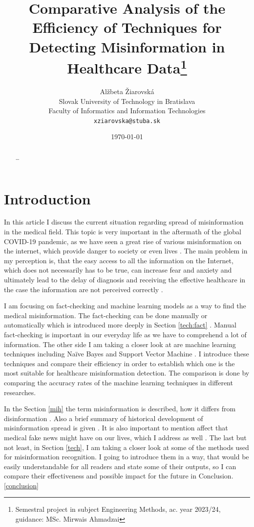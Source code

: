 \documentclass[11pt ,english,a4paper]{article}
\title{Comparative Analysis of the Efficiency of Techniques for Detecting Misinformation in Healthcare Data\thanks{Semestral project in subject Engineering Methods, ac. year 2023/24, guidance: MSc. Mirwais Ahmadzai}}
\author{Alžbeta Žiarovská\\[2pt]
	{\small Slovak University of Technology in Bratislava}\\
	{\small Faculty of Informatics and Information Technologies}\\
	{\small \texttt{xziarovska@stuba.sk}}
	}
\date{\small \today}
\begin{document}
\maketitle
\newpage

\begin{abstract}
\ldots
\end{abstract}
\newpage

\section{Introduction}\label{intro}

In this article I discuss the current situation regarding spread of misinformation in the medical field. This topic is very important in the aftermath of the global COVID-19 pandemic, as we have seen a great rise of various misinformation on the internet, which provide danger to society or even lives \cite{war18dr}. The main problem in my perception is, that the easy access to all the information on the Internet, which does not necessarily has to be true, can increase fear and anxiety and ultimately lead to the delay of diagnosis and receiving the effective healthcare in the case the information are not perceived correctly \cite{wa19sys}. 

I am focusing on fact-checking and machine learning models as a way to find the medical misinformation. The fact-checking can be done manually or automatically which is introduced more deeply in Section \ref{tech:fact} \cite{bar21health}. Manual fact-checking is important in our everyday life as we have to comprehend a lot of information. The other side I am taking a closer look at are machine learning techniques including Naïve Bayes and Support Vector Machine \cite{bar21health}. I introduce these techniques and compare their efficiency in order to establish which one is the most suitable for healthcare misinformation detection. The comparison is done by comparing the accuracy rates of the machine learning techniques in different researches.

In the Section \ref{mih} the term misinformation is described, how it differs from disinformation \cite{gu20misinfo}. Also a brief summary of historical development of misinformation spread is given \cite{pos18short}. It is also important to mention affect that medical fake news might have on our lives, which I address as well \cite{who22infodemics}. The last but not least, in Section \ref{tech}, I am taking a closer look at some of the methods used for misinformation recognition. I going to introduce them in a way, that would be easily understandable for all readers and state some of their outputs, so I can compare their effectiveness and possible impact for the future in Conclusion. \ref{conclusion}
\end{document}
